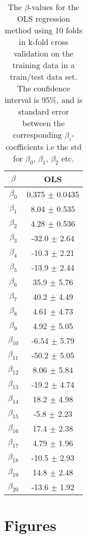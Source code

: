 \documentclass[uio,jmp,amsmath,amssymb,reprint,nofootinbib]{revtex4-1}
\numberwithin{equation}{section}
\begin{document}
\begin{table}
\begin{tabular}{|c|c|}\hline
\(\beta\) & OLS \\ \hline
\(\beta_{0}\) & 0.375 \(\pm\) 0.0435 \\ \hline
\(\beta_{1}\) & 8.04 \(\pm\) 0.535 \\ \hline
\(\beta_{2}\) & 4.28 \(\pm\) 0.536 \\ \hline
\(\beta_{3}\) & -32.0 \(\pm\) 2.64 \\ \hline
\(\beta_{4}\) & -10.3 \(\pm\) 2.21 \\ \hline
\(\beta_{5}\) & -13.9 \(\pm\) 2.44 \\ \hline
\(\beta_{6}\) & 35.9 \(\pm\) 5.76 \\ \hline
\(\beta_{7}\) & 40.2 \(\pm\) 4.49 \\ \hline
\(\beta_{8}\) & 4.61 \(\pm\) 4.73 \\ \hline
\(\beta_{9}\) & 4.92 \(\pm\) 5.05 \\ \hline
\(\beta_{10}\) & -6.54 \(\pm\) 5.79 \\ \hline
\(\beta_{11}\) & -50.2 \(\pm\) 5.05 \\ \hline
\(\beta_{12}\) & 8.06 \(\pm\) 5.84 \\ \hline
\(\beta_{13}\) & -19.2 \(\pm\) 4.74 \\ \hline
\(\beta_{14}\) & 18.2 \(\pm\) 4.98 \\ \hline
\(\beta_{15}\) & -5.8 \(\pm\) 2.23 \\ \hline
\(\beta_{16}\) & 17.4 \(\pm\) 2.38 \\ \hline
\(\beta_{17}\) & 4.79 \(\pm\) 1.96 \\ \hline
\(\beta_{18}\) & -10.5 \(\pm\) 2.93 \\ \hline
\(\beta_{19}\) & 14.8 \(\pm\) 2.48 \\ \hline
\(\beta_{20}\) & -13.6 \(\pm\) 1.92 \\ \hline
\end{tabular}
\caption{The \(\beta\)-values for the OLS regression method using 10 folds in k-fold cross validation on the training data in a train/test data set. The confidence interval is 95\%, and is standard error between the corresponding \(\beta_i\)-coefficients i.e the std for \(\beta_0\), \(\beta_1\), \(\beta_2\) etc.}
\label{tab:14}
\end{table}

\FloatBarrier

\section{Figures}
\end{document}
